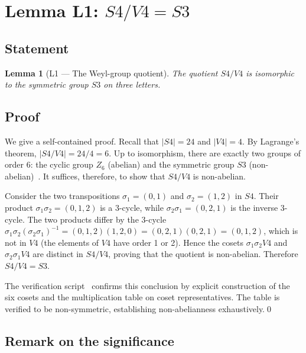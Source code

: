 \documentclass[11pt,a4paper]{article}
\def\Sfour{S4}%
\def\Vfour{V4}%
\def\Sthree{S3}%
\def\cong{=}%
\def\ZZ{Z}%
\def\mathbb#1{#1}%
\theoremstyle{plain}
\newtheorem{lemma}[theorem]{Lemma}
\theoremstyle{definition}
\theoremstyle{remark}
\newcommand{\Sfour}{S_4}
\newcommand{\Vfour}{V_4}
\newcommand{\Sthree}{S_3}
\newcommand{\ZZ}{\mathbb{Z}}
\begin{document}
\section{Lemma L1: \texorpdfstring{$\Sfour/\Vfour \cong \Sthree$}{S4/V4 = S3}}
\label{sec:L1}

\subsection{Statement}

\begin{lemma}[L1 --- The Weyl-group quotient]
\label{lem:L1}
The quotient $\Sfour/\Vfour$ is isomorphic to the symmetric group $\Sthree$ on three letters.
\end{lemma}

\subsection{Proof}

We give a self-contained proof. Recall that $|\Sfour| = 24$ and $|\Vfour| = 4$. By Lagrange's theorem, $|\Sfour/\Vfour| = 24/4 = 6$. Up to isomorphism, there are exactly two groups of order 6: the cyclic group $\ZZ_6$ (abelian) and the symmetric group $\Sthree$ (non-abelian)~\cite{Rotman_Groups}. It suffices, therefore, to show that $\Sfour/\Vfour$ is non-abelian.

Consider the two transpositions $\sigma_1 = (0,1)$ and $\sigma_2 = (1,2)$ in $\Sfour$. Their product $\sigma_1 \sigma_2 = (0,1,2)$ is a $3$-cycle, while $\sigma_2 \sigma_1 = (0,2,1)$ is the inverse $3$-cycle. The two products differ by the $3$-cycle $\sigma_1\sigma_2(\sigma_2\sigma_1)^{-1} = (0,1,2)(1,2,0) = (0,2,1)(0,2,1) = (0,1,2)$, which is not in $\Vfour$ (the elements of $\Vfour$ have order 1 or 2). Hence the cosets $\sigma_1\sigma_2 \Vfour$ and $\sigma_2 \sigma_1 \Vfour$ are distinct in $\Sfour/\Vfour$, proving that the quotient is non-abelian. Therefore $\Sfour/\Vfour \cong \Sthree$.

The verification script~\cite{PDL_SU3_script1} confirms this conclusion by explicit construction of the six cosets and the multiplication table on coset representatives. The table is verified to be non-symmetric, establishing non-abelianness exhaustively.\qed

\subsection{Remark on the significance}
\end{document}
